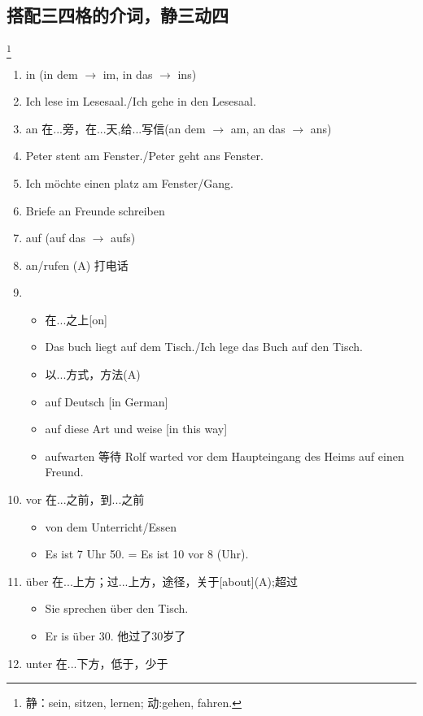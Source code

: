 \documentclass[12pt,A4paper,oneside,reqno]{amsart}
\numberwithin{equation}{section}
\theoremstyle{plain}
\theoremstyle{plain}
\theoremstyle{plain}
\numberwithin{equation}{section}
\theoremstyle{remark}
\begin{document}
\subsection{搭配三四格的介词，静三动四}
\footnote{静：sein, sitzen, lernen; 动:gehen, fahren.}
\begin{enumerate}[1.]
	\item in (in dem $\rightarrow$ im, in das $\rightarrow$ ins)
	\item [] Ich lese im Lesesaal./Ich gehe in den Lesesaal.
	\item an 在...旁，在...天,给...写信(an dem $\rightarrow$ am, an das $\rightarrow$ ans)
	\item [] Peter stent am Fenster./Peter geht ans Fenster.
	\item [] Ich m\"{o}chte einen platz am Fenster/Gang.
	\item [] Briefe an Freunde schreiben
	\item auf (auf das $\rightarrow$ aufs)
		\item [] an/rufen (A) 打电话
	\item [] 
	\begin{itemize}
		\item 在...之上[on]
		\item [] Das buch liegt auf dem Tisch./Ich lege das Buch auf den Tisch.
		\item 以...方式，方法(A)
		\item [] auf Deutsch [in German]
		\item [] auf diese Art und weise [in this way]
		\item [] aufwarten 等待 Rolf warted vor dem Haupteingang des Heims auf einen Freund.
	\end{itemize}	
	\item vor 在...之前，到...之前
\renewcommand\labelitemi{\normalfont\bfseries \textendash}
\begin{itemize}
	\item von dem Unterricht/Essen
	\item Es ist 7 Uhr 50. = Es ist 10 vor 8 (Uhr).
\end{itemize}
	\item \"{u}ber 在...上方；过...上方，途径，关于[about](A);超过
\renewcommand\labelitemi{\normalfont\bfseries \textendash}
\begin{itemize}
	\item Sie sprechen \"{u}ber den Tisch.
	\item Er is \"{u}ber 30. 他过了30岁了
\end{itemize}
		\item unter 在...下方，低于，少于

\end{enumerate}
\end{document}
